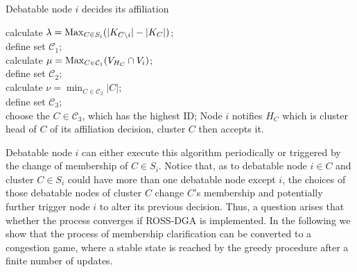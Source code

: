 \begin{algorithm}               %
\caption{Debatable node $i$ decides its affiliation}          %
\label{alg4}
\DontPrintSemicolon
\SetAlgoLined
{}
calculate $\lambda = \operatorname*{Max}_{C\in S_i}(|K_{C\setminus i}|-|K_C|)$;\\
define set $\mathcal{C}_1$;\\	
{
calculate $\mu= \operatorname*{Max}_{C\in \mathcal{C}_1}(V_{H_C}\cap V_i)$;\\
define set $\mathcal{C}_2$;\\	
	{
	calculate $\nu=\min_{C\in \mathcal{C}_2}|C|$;\\
	define set $\mathcal{C}_3$;\\	
		{choose the $C\in \mathcal{C}_3$, which has the highest ID;
		}
	}
}
Node $i$ notifies $H_C$ which is cluster head of $C$ of its affiliation decision, cluster $C$ then accepts it.

\end{algorithm}

Debatable node $i$ can either execute this algorithm periodically or triggered by the change of membership of $C\in S_i$. 
Notice that, as to debatable node $i\in C$ and cluster $C\in S_i$ could have more than one debatable node except $i$, the choices of those debatable nodes of cluster $C$ change $C$'s membership and potentially further trigger node $i$ to alter its previous decision. 
Thus, a question arises that whether the process converges if ROSS-DGA is implemented.
In the following we show that the process of membership clarification can be converted to a congestion game, where a stable state is reached by the greedy procedure after a finite number of updates.

